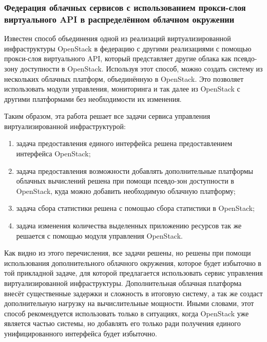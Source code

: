 \subsubsection*{Федерация облачных сервисов с использованием прокси-слоя виртуального API в распределённом облачном окружении}
Известен способ объединения одной из реализаций виртуализированной инфраструктуры OpenStack в федерацию с другими реализациями с помощью прокси-слоя виртуального API, который представляет другие облака как псевдо-зону доступности в OpenStack\cite{federated-cloud-services}.
Используя этот способ, можно создать систему из нескольких облачных платформ, объединённую в OpenStack. Это позволяет использовать модули управления, мониторинга и так далее из OpenStack с другими платформами без необходимости их изменения.

Таким образом, эта работа решает все задачи сервиса управления виртуализированной инфраструктурой:
\begin{enumerate}
    \item задача предоставления единого интерфейса решена предоставлением интерфейса OpenStack;
    \item задача предоставления возможности добавлять дополнительные платформы облачных вычислений решена при помощи псевдо-зон доступности в OpenStack, куда можно добавить необходимую облачную платформу;
    \item задача сбора статистики решена с помощью сбора статистики в OpenStack;
    \item задача изменения количества выделенных приложению ресурсов так же решается с помощью модуля управления OpenStack.
\end{enumerate}
Как видно из этого перечисления, все задачи решены, но решены при помощи использования дополнительного облачного окружения, которое будет избыточно в той прикладной задаче, для которой предлагается использовать сервис управления виртуализированной инфраструктуры.
Дополнительная облачная платформа внесёт существенные задержки и сложность в итоговую систему, а так же создаст дополнительную нагрузку на вычислительные мощности.
Иными словами, этот способ рекомендуется использовать только в ситуациях, когда OpenStack уже является частью системы, но добавлять его только ради получения единого унифицированного интерфейса будет избыточно.